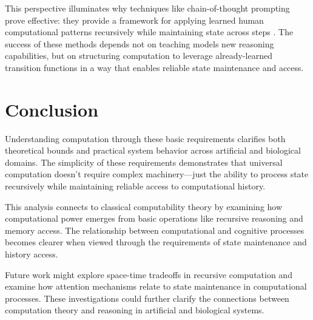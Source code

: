 \documentclass[12pt]{article}
\begin{document}
This perspective illuminates why techniques like chain-of-thought prompting prove effective: they provide a framework for applying learned human computational patterns recursively while maintaining state across steps \cite{wei2022chain}. The success of these methods depends not on teaching models new reasoning capabilities, but on structuring computation to leverage already-learned transition functions in a way that enables reliable state maintenance and access.

\section{Conclusion}

Understanding computation through these basic requirements clarifies both theoretical bounds and practical system behavior across artificial and biological domains. The simplicity of these requirements demonstrates that universal computation doesn't require complex machinery---just the ability to process state recursively while maintaining reliable access to computational history.

This analysis connects to classical computability theory by examining how computational power emerges from basic operations like recursive reasoning and memory access. The relationship between computational and cognitive processes becomes clearer when viewed through the requirements of state maintenance and history access.

Future work might explore space-time tradeoffs in recursive computation and examine how attention mechanisms relate to state maintenance in computational processes. These investigations could further clarify the connections between computation theory and reasoning in artificial and biological systems.

\begingroup
\footnotesize


\endgroup
\end{document}
